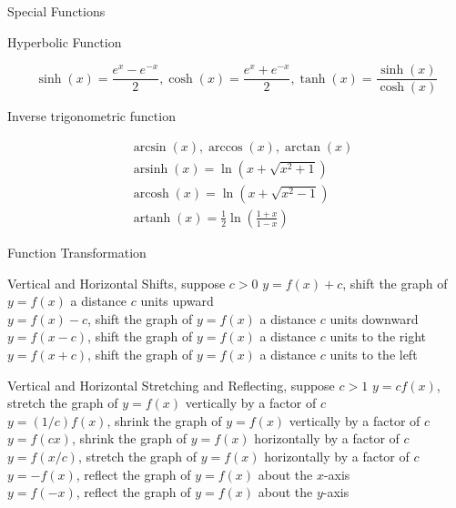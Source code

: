 \begin{frame}{Special Functions}
    \begin{block}{Hyperbolic Function}

        $$
            \sinh (x)=\frac{e^{x}-e^{-x}}{2}, \cosh (x)=\frac{e^{x}+e^{-x}}{2}, \tanh (x)=\frac{\sinh (x)}{\cosh (x)}
        $$
    \end{block}
    \begin{block}{Inverse trigonometric function}

        $$
            \begin{aligned}
                 & \arcsin (x), \arccos (x), \arctan (x)                      \\
                 & \operatorname{arsinh}(x)=\ln \left(x+\sqrt{x^{2}+1}\right) \\ &\operatorname{arcosh}(x)=\ln \left(x+\sqrt{x^{2}-1}\right)\\ &\operatorname{artanh}(x)=\frac{1}{2} \ln \left(\frac{1+x}{1-x}\right)
            \end{aligned}
        $$
    \end{block}
\end{frame}
\begin{frame}{Function Transformation}
    \begin{block}{Vertical and Horizontal Shifts, suppose $c>0$}
        $y=f(x)+c$, shift the graph of $y=f(x)$ a distance $c$ units upward\\ $y=f(x)-c$, shift the graph of $y=f(x)$ a distance $c$ units downward\\ $y=f(x-c)$, shift the graph of $y=f(x)$ a distance $c$ units to the right\\ $y=f(x+c)$, shift the graph of $y=f(x)$ a distance $c$ units to the left\\
    \end{block}
    \begin{block}{Vertical and Horizontal Stretching and Reflecting, suppose $c>1$}
        $y=c f(x)$, stretch the graph of $y=f(x)$ vertically by a factor of $c$\\ $y=(1 / c) f(x)$, shrink the graph of $y=f(x)$ vertically by a factor of $c$\\
        $y=f(c x)$, shrink the graph of $y=f(x)$ horizontally by a factor of $c$\\ $y=f(x / c)$, stretch the graph of $y=f(x)$ horizontally by a factor of $c$\\
        $y=-f(x)$, reflect the graph of $y=f(x)$ about the $x$-axis\\ $y=f(-x)$, reflect the graph of $y=f(x)$ about the $y$-axis
    \end{block}
\end{frame}

